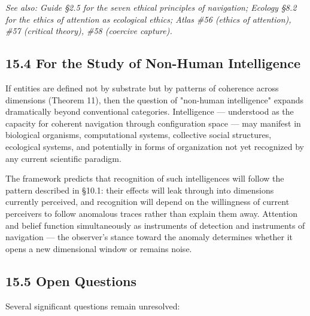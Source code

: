 \textit{See also: Guide §2.5 for the seven ethical principles of navigation; Ecology §8.2 for the ethics of attention as ecological ethics; Atlas \#56 (ethics of attention), \#57 (critical theory), \#58 (coercive capture).}


\subsection*{15.4 For the Study of Non-Human Intelligence}


If entities are defined not by substrate but by patterns of coherence across dimensions (Theorem 11), then the question of "non-human intelligence" expands dramatically beyond conventional categories. Intelligence — understood as the capacity for coherent navigation through configuration space — may manifest in biological organisms, computational systems, collective social structures, ecological systems, and potentially in forms of organization not yet recognized by any current scientific paradigm.


The framework predicts that recognition of such intelligences will follow the pattern described in §10.1: their effects will leak through into dimensions currently perceived, and recognition will depend on the willingness of current perceivers to follow anomalous traces rather than explain them away. Attention and belief function simultaneously as instruments of detection and instruments of navigation — the observer's stance toward the anomaly determines whether it opens a new dimensional window or remains noise.


\subsection*{15.5 Open Questions}


Several significant questions remain unresolved:



